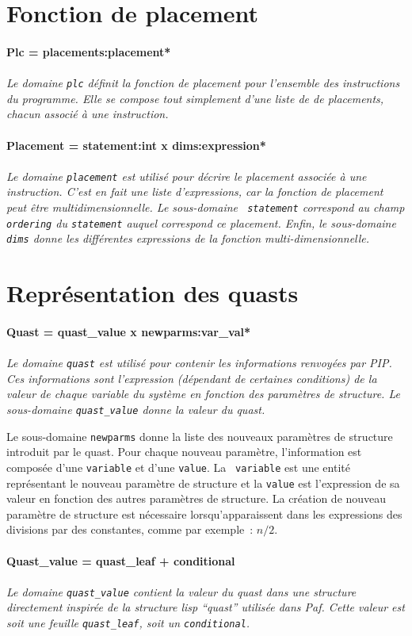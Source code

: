 \documentclass{article}
\newcommand{\domain}[2]{\paragraph{{#1}}\paragraph{}{\em #2}}
\begin{document}
\section{Fonction de placement}

\domain{Plc = placements:placement*}
{Le domaine {\tt plc} d\'efinit la fonction de placement pour l'ensemble des 
instructions du programme. Elle se compose tout simplement d'une liste de de 
placements, chacun associ\'e \`a une instruction.}

\domain{Placement = statement:int x dims:expression*}
{Le domaine {\tt placement} est utilis\'e pour d\'ecrire le placement 
associ\'ee \`a une instruction. C'est en fait une liste d'expressions, car la 
fonction de placement peut \^etre multidimensionnelle. Le sous-domaine {\tt 
statement} correspond au champ {\tt ordering} du {\tt statement} auquel 
correspond ce placement. Enfin, le sous-domaine {\tt dims} donne les 
diff\'erentes expressions de la fonction multi-dimensionnelle.}

\section{Repr\'esentation des quasts}

\domain{Quast = quast\_value x newparms:var\_val*}
{Le domaine {\tt quast} est utilis\'e pour contenir les informations 
renvoy\'ees par PIP. Ces informations sont l'expression (d\'ependant de 
certaines conditions) de la valeur de chaque variable du syst\`eme en fonction 
des param\`etres de structure. Le sous-domaine {\tt quast\_value} donne la 
valeur du quast.

Le sous-domaine {\tt newparms} donne la liste des nouveaux param\`etres de 
structure introduit par le quast. Pour chaque nouveau param\`etre, 
l'information est compos\'ee d'une {\tt variable} et d'une {\tt value}. La {\tt
variable} est une entit\'e repr\'esentant le nouveau param\`etre de structure 
et la {\tt value} est l'expression de sa valeur en fonction des autres 
param\`etres de structure. La cr\'eation de nouveau param\`etre de structure 
est n\'ecessaire lorsqu'apparaissent dans les expressions des divisions par des
constantes, comme par exemple~: \( n/2\).}

\domain{Quast\_value = quast\_leaf + conditional}
{Le domaine {\tt quast\_value} contient la valeur du quast dans une structure 
directement inspir\'ee de la structure lisp ``quast'' utilis\'ee dans Paf. 
Cette valeur est soit une feuille {\tt quast\_leaf},
soit un {\tt conditional}.}
\end{document}
